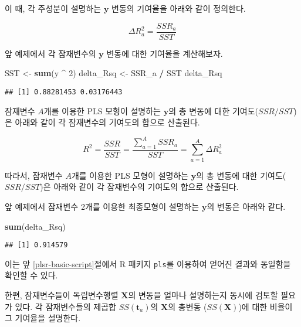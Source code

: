 \documentclass[]{book}
\newenvironment{Shaded}{\begin{snugshade}}{\end{snugshade}}
\newcommand{\DecValTok}[1]{\textcolor[rgb]{0.00,0.00,0.81}{#1}}
\newcommand{\KeywordTok}[1]{\textcolor[rgb]{0.13,0.29,0.53}{\textbf{#1}}}
\newcommand{\NormalTok}[1]{#1}
\newcommand{\OperatorTok}[1]{\textcolor[rgb]{0.81,0.36,0.00}{\textbf{#1}}}
\newcommand{\StringTok}[1]{\textcolor[rgb]{0.31,0.60,0.02}{#1}}
\begin{document}
이 때, 각 주성분이 설명하는 \(\mathbf{y}\) 변동의 기여율을 아래와 같이 정의한다.

\begin{equation}
\Delta R_a^2 = \frac{SSR_a}{SST} \label{eq:plsr-rsq}
\end{equation}

앞 예제에서 각 잠재변수의 \(\mathbf{y}\) 변동에 대한 기여율을 계산해보자.

\begin{Shaded}
\begin{Highlighting}[]
\NormalTok{SST <-}\StringTok{ }\KeywordTok{sum}\NormalTok{(y }\OperatorTok{^}\StringTok{ }\DecValTok{2}\NormalTok{)}
\NormalTok{delta_Rsq <-}\StringTok{ }\NormalTok{SSR_a }\OperatorTok{/}\StringTok{ }\NormalTok{SST}
\NormalTok{delta_Rsq}
\end{Highlighting}
\end{Shaded}

\begin{verbatim}
## [1] 0.88281453 0.03176443
\end{verbatim}

잠재변수 \(A\)개를 이용한 PLS 모형이 설명하는 \(\mathbf{y}\)의 총 변동에 대한 기여도(\(SSR / SST\))은 아래와 같이 각 잠재변수의 기여도의 합으로 산출된다.

\[
R^2 = \frac{SSR}{SST} = \frac{\sum_{a = 1}^{A} SSR_a}{SST} = \sum_{a = 1}^{A} \Delta R_a^2
\]

따라서, 잠재변수 \(A\)개를 이용한 PLS 모형이 설명하는 \(\mathbf{y}\)의 총 변동에 대한 기여도(\(SSR / SST\))은 아래와 같이 각 잠재변수의 기여도의 합으로 산출된다.

앞 예제에서 잠재변수 2개를 이용한 최종모형이 설명하는 \(\mathbf{y}\)의 변동은 아래와 같다.

\begin{Shaded}
\begin{Highlighting}[]
\KeywordTok{sum}\NormalTok{(delta_Rsq)}
\end{Highlighting}
\end{Shaded}

\begin{verbatim}
## [1] 0.914579
\end{verbatim}

이는 앞 \ref{plsr-basic-script}절에서 R 패키지 \texttt{pls}를 이용하여 얻어진 결과와 동일함을 확인할 수 있다.

한편, 잠재변수들이 독립변수행렬 \(\mathbf{X}\)의 변동을 얼마나 설명하는지 동시에 검토할 필요가 있다. 각 잠재변수들의 제곱합 \(SS(\mathbf{t}_a)\)의 \(\mathbf{X}\)의 총변동 (\(SS(\mathbf{X})\))에 대한 비율이 그 기여율을 설명한다.
\end{document}
